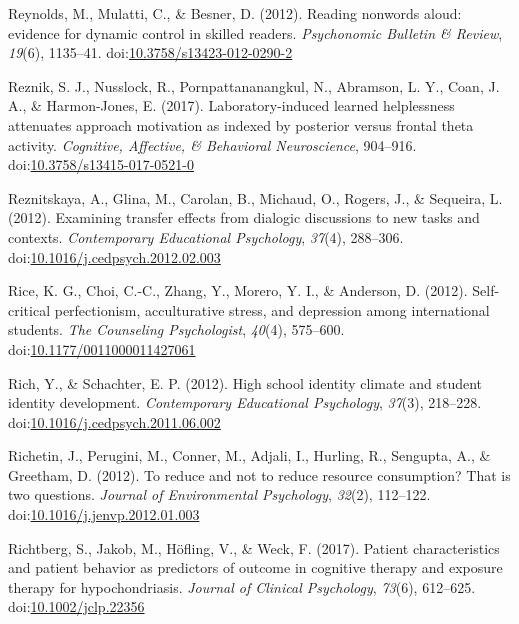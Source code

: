 \documentclass[english,man]{apa6}
\theoremstyle{definition}
\theoremstyle{definition}
\theoremstyle{definition}
\theoremstyle{remark}
\begin{document}
\hypertarget{ref-Reynolds2012}{}
Reynolds, M., Mulatti, C., \& Besner, D. (2012). Reading nonwords aloud:
evidence for dynamic control in skilled readers. \emph{Psychonomic
Bulletin \& Review}, \emph{19}(6), 1135--41.
doi:\href{https://doi.org/10.3758/s13423-012-0290-2}{10.3758/s13423-012-0290-2}

\hypertarget{ref-Reznik2017}{}
Reznik, S. J., Nusslock, R., Pornpattananangkul, N., Abramson, L. Y.,
Coan, J. A., \& Harmon-Jones, E. (2017). Laboratory-induced learned
helplessness attenuates approach motivation as indexed by posterior
versus frontal theta activity. \emph{Cognitive, Affective, \& Behavioral
Neuroscience}, 904--916.
doi:\href{https://doi.org/10.3758/s13415-017-0521-0}{10.3758/s13415-017-0521-0}

\hypertarget{ref-Reznitskaya2012}{}
Reznitskaya, A., Glina, M., Carolan, B., Michaud, O., Rogers, J., \&
Sequeira, L. (2012). Examining transfer effects from dialogic
discussions to new tasks and contexts. \emph{Contemporary Educational
Psychology}, \emph{37}(4), 288--306.
doi:\href{https://doi.org/10.1016/j.cedpsych.2012.02.003}{10.1016/j.cedpsych.2012.02.003}

\hypertarget{ref-Rice2012}{}
Rice, K. G., Choi, C.-C., Zhang, Y., Morero, Y. I., \& Anderson, D.
(2012). Self-critical perfectionism, acculturative stress, and
depression among international students. \emph{The Counseling
Psychologist}, \emph{40}(4), 575--600.
doi:\href{https://doi.org/10.1177/0011000011427061}{10.1177/0011000011427061}

\hypertarget{ref-Rich2012}{}
Rich, Y., \& Schachter, E. P. (2012). High school identity climate and
student identity development. \emph{Contemporary Educational
Psychology}, \emph{37}(3), 218--228.
doi:\href{https://doi.org/10.1016/j.cedpsych.2011.06.002}{10.1016/j.cedpsych.2011.06.002}

\hypertarget{ref-Richetin2012}{}
Richetin, J., Perugini, M., Conner, M., Adjali, I., Hurling, R.,
Sengupta, A., \& Greetham, D. (2012). To reduce and not to reduce
resource consumption? That is two questions. \emph{Journal of
Environmental Psychology}, \emph{32}(2), 112--122.
doi:\href{https://doi.org/10.1016/j.jenvp.2012.01.003}{10.1016/j.jenvp.2012.01.003}

\hypertarget{ref-Richtberg2017}{}
Richtberg, S., Jakob, M., Höfling, V., \& Weck, F. (2017). Patient
characteristics and patient behavior as predictors of outcome in
cognitive therapy and exposure therapy for hypochondriasis.
\emph{Journal of Clinical Psychology}, \emph{73}(6), 612--625.
doi:\href{https://doi.org/10.1002/jclp.22356}{10.1002/jclp.22356}
\end{document}
